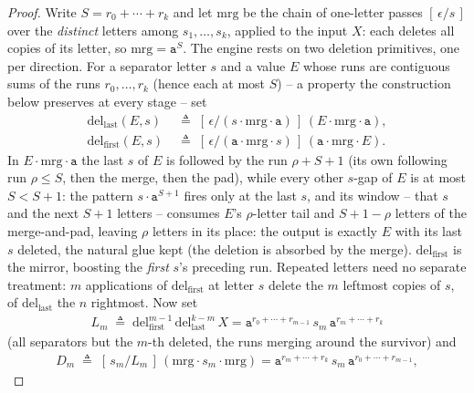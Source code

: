 \documentclass[runningheads,envcountsect]{llncs}
\begin{document}
\begin{proof}
    Write $S = r_0 + \cdots + r_k$ and let $\mathrm{mrg}$ be the chain of one-letter passes $[\,\epsilon/s\,]$ over the \emph{distinct} letters among $s_1, \dots, s_k$, applied to the input $X$: each deletes all copies of its letter, so $\mathrm{mrg} = \mathtt a^{S}$. The engine rests on two deletion primitives, one per direction. For a separator letter $s$ and a value $E$ whose runs are contiguous sums of the runs $r_0, \dots, r_k$ (hence each at most $S$) -- a property the construction below preserves at every stage -- set
    \begin{align*}
        \mathrm{del}_{\mathrm{last}}(E, s) \;&\triangleq\; [\,\epsilon/(s \cdot \mathrm{mrg} \cdot \mathtt a)\,]\,(E \cdot \mathrm{mrg} \cdot \mathtt a),\\
        \mathrm{del}_{\mathrm{first}}(E, s) \;&\triangleq\; [\,\epsilon/(\mathtt a \cdot \mathrm{mrg} \cdot s)\,]\,(\mathtt a \cdot \mathrm{mrg} \cdot E).
    \end{align*}
    In $E \cdot \mathrm{mrg} \cdot \mathtt a$ the last $s$ of $E$ is followed by the run $\rho + S + 1$ (its own following run $\rho \leq S$, then the merge, then the pad), while every other $s$-gap of $E$ is at most $S < S + 1$: the pattern $s \cdot \mathtt a^{S+1}$ fires only at the last $s$, and its window -- that $s$ and the next $S + 1$ letters -- consumes $E$'s $\rho$-letter tail and $S + 1 - \rho$ letters of the merge-and-pad, leaving $\rho$ letters in its place: the output is exactly $E$ with its last $s$ deleted, the natural glue kept (the deletion is absorbed by the merge). $\mathrm{del}_{\mathrm{first}}$ is the mirror, boosting the \emph{first} $s$'s preceding run. Repeated letters need no separate treatment: $m$ applications of $\mathrm{del}_{\mathrm{first}}$ at letter $s$ delete the $m$ leftmost copies of $s$, of $\mathrm{del}_{\mathrm{last}}$ the $n$ rightmost. Now set
    \begin{align*}
        L_m \;\triangleq\; \mathrm{del}_{\mathrm{first}}^{m-1}\,\mathrm{del}_{\mathrm{last}}^{k-m}\,X = \mathtt a^{r_0 + \cdots + r_{m-1}}\, s_m\, \mathtt a^{r_m + \cdots + r_k}
    \end{align*}
    (all separators but the $m$-th deleted, the runs merging around the survivor) and
    \begin{align*}
        D_m \;\triangleq\; [\,s_m/L_m\,]\,(\mathrm{mrg} \cdot s_m \cdot \mathrm{mrg}) = \mathtt a^{r_m + \cdots + r_k}\, s_m\, \mathtt a^{r_0 + \cdots + r_{m-1}},
    \end{align*}

\end{proof}
\end{document}
